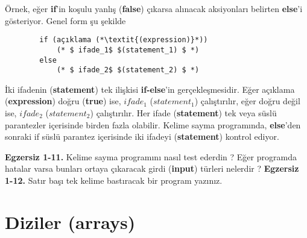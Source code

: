 \documentclass[a4paper,12pt,oneside]{book}
\begin{document}
\par Örnek, eğer \textbf{if}'in koşulu yanlış (\textbf{false}) çıkarsa alınacak aksiyonları belirten \textbf{else}'i gösteriyor. Genel form şu şekilde
\begin{lstlisting}
		if (açıklama (*\textit{(expression)}*))
			(* $ ifade_1$ $(statement_1) $ *)
		else
			(* $ ifade_2$ $(statement_2) $ *)

\end{lstlisting}
\noindent İki ifadenin (\textbf{statement}) tek ilişkisi \textbf{if-else}'in gerçekleşmesidir. Eğer açıklama (\textbf{expression}) doğru (\textbf{true}) ise, $ ifade_1 $ (\textbf{$ statement_1 $}) çalıştırılır, eğer doğru değil ise, $ ifade_2 $ ($ statement_2 $) çalıştırılır. Her ifade (\textbf{statement}) tek veya süslü parantezler içerisinde birden fazla olabilir. Kelime sayma programında, \textbf{else}'den sonraki if süslü parantez içerisinde iki ifadeyi (\textbf{statement}) kontrol ediyor. \newline

\noindent \textbf{Egzersiz 1-11.} Kelime sayma programını nasıl test ederdin ? Eğer programda hatalar varsa bunları ortaya çıkaracak girdi (\textbf{input}) türleri nelerdir ? \newline
\newline \textbf{Egzersiz 1-12.} Satır başı tek kelime bastıracak bir program yazınız.

\section{Diziler (arrays)}
\end{document}

